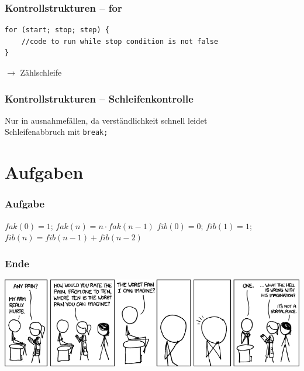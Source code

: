 \documentclass{beamer}
\begin{document}
\begin{frame}[fragile]
\frametitle{Kontrollstrukturen -- for}
\begin{verbatim}
for (start; stop; step) {
    //code to run while stop condition is not false
}
\end{verbatim}
$\rightarrow$ Z\"{a}hlschleife
\end{frame}

\begin{frame}[fragile]
\frametitle{Kontrollstrukturen -- Schleifenkontrolle}
Nur in ausnahmef\"{a}llen, da verst\"{a}ndlichkeit schnell leidet\\
Schleifenabbruch mit \verb|break;|
\end{frame}

\section{Aufgaben}
\begin{frame}
\frametitle{Aufgabe}
$fak(0)=1$; $fak(n) = n\cdot{}fak(n-1)$
$fib(0)=0$; $fib(1)=1$; $fib(n)=fib(n-1)+fib(n-2)$
\end{frame}

\begin{frame}
\frametitle{Ende}
\includegraphics[scale=0.4]{pain_rating.png}
\end{frame}
\end{document}

